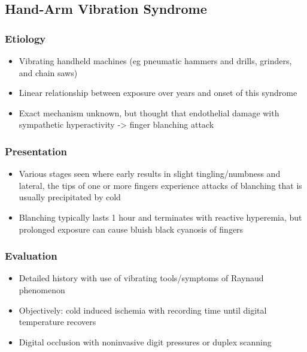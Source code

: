 \documentclass[
]{book}
\begin{document}
\hypertarget{hand-arm-vibration-syndrome}{%
\subsection{Hand-Arm Vibration Syndrome}\label{hand-arm-vibration-syndrome}}

\hypertarget{etiology-3}{%
\subsubsection{Etiology}\label{etiology-3}}

\begin{itemize}
\item
  Vibrating handheld machines (eg pneumatic hammers and drills,
  grinders, and chain saws)
\item
  Linear relationship between exposure over years and onset of this
  syndrome
\item
  Exact mechanism unknown, but thought that endothelial damage with
  sympathetic hyperactivity -\textgreater{} finger blanching attack
\end{itemize}

\hypertarget{presentation-3}{%
\subsubsection{Presentation}\label{presentation-3}}

\begin{itemize}
\item
  Various stages seen where early results in slight tingling/numbness
  and lateral, the tips of one or more fingers experience attacks of
  blanching that is usually precipitated by cold
\item
  Blanching typically lasts 1 hour and terminates with reactive
  hyperemia, but prolonged exposure can cause bluish black cyanosis of
  fingers
\end{itemize}

\hypertarget{evaluation-4}{%
\subsubsection{Evaluation}\label{evaluation-4}}

\begin{itemize}
\item
  Detailed history with use of vibrating tools/symptoms of Raynaud
  phenomenon
\item
  Objectively: cold induced ischemia with recording time until digital
  temperature recovers
\item
  Digital occlusion with noninvasive digit pressures or duplex
  scanning
\end{itemize}
\end{document}
